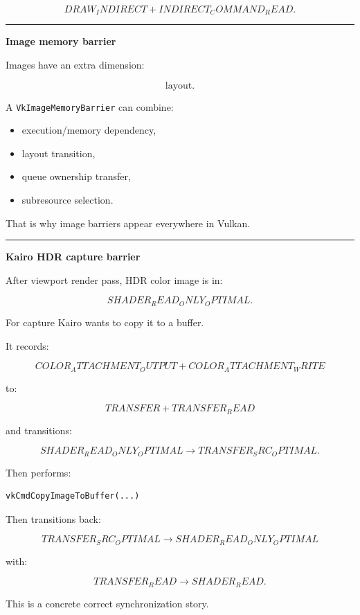 \[
DRAW_INDIRECT
+
INDIRECT_COMMAND_READ.
\]

\begin{center}\rule{0.5\linewidth}{0.5pt}\end{center}

\textbf{Image memory barrier}

Images have an extra dimension:

\[
\boxed{\text{layout}.}
\]

A \texttt{VkImageMemoryBarrier} can combine:

\begin{itemize}
\tightlist
\item
  execution/memory dependency,
\item
  layout transition,
\item
  queue ownership transfer,
\item
  subresource selection.
\end{itemize}

That is why image barriers appear everywhere in Vulkan.

\begin{center}\rule{0.5\linewidth}{0.5pt}\end{center}

\textbf{Kairo HDR capture barrier}

After viewport render pass, HDR color image is in:

\[
SHADER_READ_ONLY_OPTIMAL.
\]

For capture Kairo wants to copy it to a buffer.

It records:

\[
COLOR_ATTACHMENT_OUTPUT
+
COLOR_ATTACHMENT_WRITE
\]

to:

\[
TRANSFER
+
TRANSFER_READ
\]

and transitions:

\[
SHADER_READ_ONLY_OPTIMAL
\rightarrow
TRANSFER_SRC_OPTIMAL.
\]

Then performs:

\begin{verbatim}
vkCmdCopyImageToBuffer(...)
\end{verbatim}

Then transitions back:

\[
TRANSFER_SRC_OPTIMAL
\rightarrow
SHADER_READ_ONLY_OPTIMAL
\]

with:

\[
TRANSFER_READ
\rightarrow
SHADER_READ.
\]

This is a concrete correct synchronization story.

